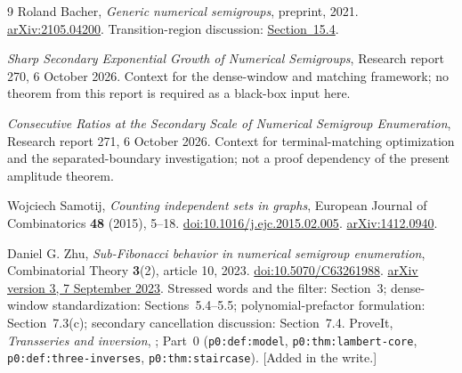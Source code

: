 \documentclass[11pt,letterpaper]{article}
\theoremstyle{definition}
\newcommand{\file}[1]{\nolinkurl{#1}}
\begin{document}
\clearpage
\begin{thebibliography}{9}
Roland Bacher, \emph{Generic numerical semigroups}, preprint, 2021.
\href{https://arxiv.org/abs/2105.04200}{arXiv:2105.04200}.
Transition-region discussion: \href{https://arxiv.org/html/2105.04200v1\#S15.SS4}{Section~15.4}.

\emph{Sharp Secondary Exponential Growth of Numerical Semigroups}, Research report 270, 6 October 2026. Context for the dense-window and matching framework; no theorem from this report is required as a black-box input here.

\emph{Consecutive Ratios at the Secondary Scale of Numerical Semigroup Enumeration}, Research report 271, 6 October 2026. Context for terminal-matching optimization and the separated-boundary investigation; not a proof dependency of the present amplitude theorem.

Wojciech Samotij, \emph{Counting independent sets in graphs}, European Journal of Combinatorics \textbf{48} (2015), 5--18.
\href{https://doi.org/10.1016/j.ejc.2015.02.005}{doi:10.1016/j.ejc.2015.02.005}.
\href{https://arxiv.org/abs/1412.0940}{arXiv:1412.0940}.

Daniel G. Zhu, \emph{Sub-Fibonacci behavior in numerical semigroup enumeration}, Combinatorial Theory \textbf{3}(2), article 10, 2023.
\href{https://doi.org/10.5070/C63261988}{doi:10.5070/C63261988}.
\href{https://arxiv.org/html/2202.05755v3}{arXiv version 3, 7 September 2023}.
Stressed words and the filter: Section~3; dense-window standardization: Sections~5.4--5.5; polynomial-prefactor formulation: Section~7.3(c); secondary cancellation discussion: Section~7.4.
ProveIt, \emph{Transseries and inversion}, ; Part~0 (\file{p0:def:model}, \file{p0:thm:lambert-core}, \file{p0:def:three-inverses}, \file{p0:thm:staircase}). [Added in the write.]
\end{thebibliography}
\end{document}
